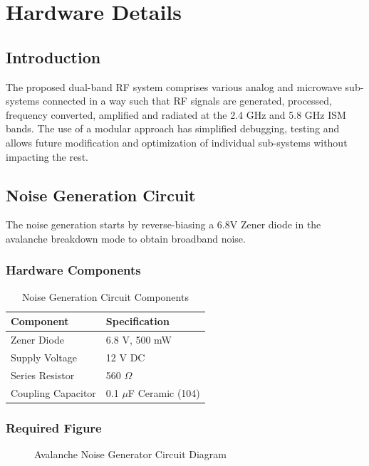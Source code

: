 \documentclass[12pt,a4paper]{report}
\begin{document}
	\section{Hardware Details}
	
	\subsection{Introduction}
	The proposed dual-band RF system comprises various analog and microwave sub-systems connected in a way such that RF signals are generated, processed, frequency converted, amplified and radiated at the 2.4 GHz and 5.8 GHz ISM bands. The use of a modular approach has simplified debugging, testing and allows future modification and optimization of individual sub-systems without impacting the rest.
	
	\subsection{Noise Generation Circuit}
	The noise generation starts by reverse-biasing a 6.8V Zener diode in the avalanche breakdown mode to obtain broadband noise.
	\subsubsection{Hardware Components}
	\begin{table}[htbp]
		\centering
		\caption{Noise Generation Circuit Components}
		\label{tab:noise_hw}
		\begin{tabular}{p{5cm} p{5cm}}
			\toprule
			\textbf{Component} & \textbf{Specification} \\
			\midrule
			Zener Diode & 6.8 V, 500 mW \\
			Supply Voltage & 12 V DC \\
			Series Resistor & 560 $\Omega$ \\
			Coupling Capacitor & 0.1 $\mu$F Ceramic (104) \\
			\bottomrule
		\end{tabular}
	\end{table}
	
	\subsubsection{Required Figure}
	\begin{figure}[htbp]
		\centering
		\caption{Avalanche Noise Generator Circuit Diagram}
		\label{fig:noise_circuit}
	\end{figure}
	
\end{document}
